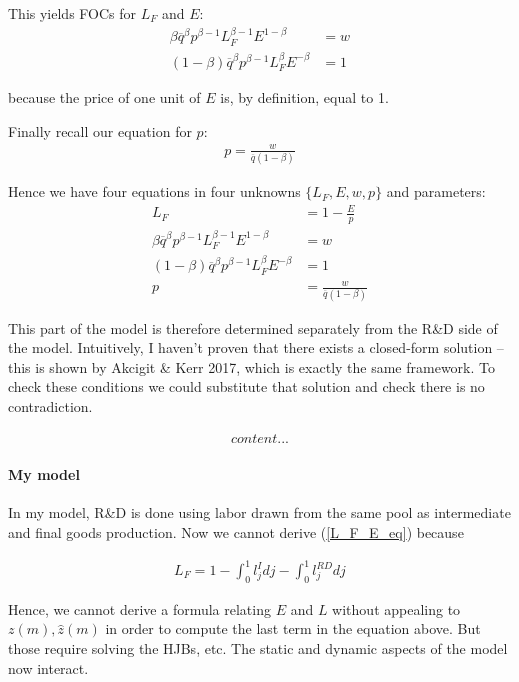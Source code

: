 \documentclass[12pt,english]{article}
\theoremstyle{remark}
\begin{document}
This yields FOCs for $L_F$ and $E$:
\begin{align*}
\beta \overline{q}^{\beta} p^{\beta - 1} L_F^{\beta -1} E^{1-\beta} &= w \\ 
(1-\beta) \overline{q}^{\beta} p^{\beta - 1} L_F^{\beta} E^{-\beta} &= 1 
\end{align*}

because the price of one unit of $E$ is, by definition, equal to 1. 

Finally recall our equation for $p$: 
\begin{align*}
p = \frac{w}{\overline{q}(1-\beta)}
\end{align*}

Hence we have four equations in four unknowns $\{ L_F,E,w,p \}$ and parameters:
\begin{align}
L_F	&= 1- \frac{E}{p} \label{L_F_E_eq}\\
\beta \overline{q}^{\beta} p^{\beta - 1} L_F^{\beta -1} E^{1-\beta} &= w \\ 
(1-\beta) \overline{q}^{\beta} p^{\beta - 1} L_F^{\beta} E^{-\beta} &= 1 \\
p &= \frac{w}{\overline{q}(1-\beta)}
\end{align}

This part of the model is therefore determined separately from the R\&D side of the model. Intuitively, I haven't proven that there exists a closed-form solution -- this is shown by Akcigit \& Kerr 2017, which is exactly the same framework. To check these conditions we could substitute that solution and check there is no contradiction.

\begin{align*}
content...
\end{align*}


\paragraph{My model} In my model, R\&D is done using labor drawn from the same pool as intermediate and final goods production. Now we cannot derive (\ref{L_F_E_eq}) because 

\begin{align*}
L_F = 1 - \int_0^1 l_j^I dj - \int_0^1 l_j^{RD} dj
\end{align*}

Hence, we cannot derive a formula relating $E$ and $L$ without appealing to $z(m),\hat{z}(m)$ in order to compute the last term in the equation above. But those require solving the HJBs, etc. The static and dynamic aspects of the model now interact. 
\end{document}
